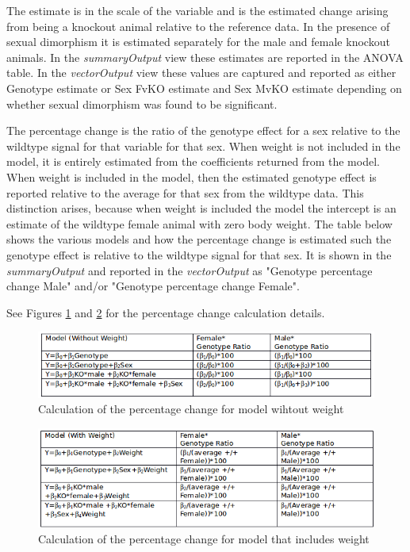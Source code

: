 \documentclass[12pt,a4paper]{article}
\begin{document}
The estimate is in the scale of the variable and is the estimated change arising from being a knockout animal relative to the reference data. In the presence of sexual dimorphism it is estimated separately for the male and female knockout animals. In the \textit{summaryOutput} view these estimates are reported in the ANOVA table. In the \textit{vectorOutput} view these values are captured and reported as either Genotype estimate or Sex FvKO estimate and Sex MvKO estimate depending on whether sexual dimorphism was found to be significant.

The percentage change is the ratio of the genotype effect for a sex relative to the wildtype signal for that variable for that sex. When weight is not included in the model, it is entirely estimated from the coefficients returned from the model. When weight is included in the model, then the estimated genotype effect is reported relative to the average for that sex from the wildtype data. This distinction arises, because when weight is included the model the intercept is an estimate of the wildtype female animal with zero body weight. The table below shows the various models and how the percentage change is estimated such the genotype effect is relative to the wildtype signal for that sex.  It is shown in the \textit{summaryOutput} and reported in the \textit{vectorOutput} as "Genotype percentage change Male" and/or "Genotype percentage change Female".  

See Figures \ref{fig:05_be1} and \ref{fig:05_be2} for the percentage change calculation details.

\begin{figure}[!htpb]%
\centerline{\includegraphics[scale=0.6]{BiologicalEffect1.png}}
\caption{Calculation of the percentage change for model wihtout weight}\label{fig:05_be1}
\end{figure}

\begin{figure}[!htpb]%
\centerline{\includegraphics[scale=0.6]{BiologicalEffect2.png}}
\caption{Calculation of the percentage change for model that includes weight}\label{fig:05_be2}
\end{figure}
\end{document}
